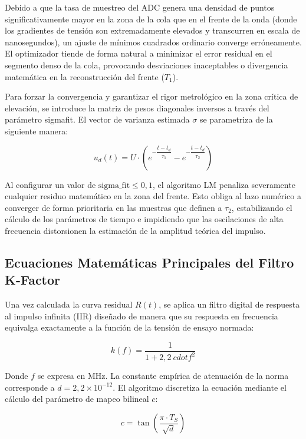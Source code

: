 Debido a que la tasa de muestreo del ADC genera una densidad de puntos significativamente mayor en la zona de la cola que en el frente de la onda (donde los gradientes de tensión son extremadamente elevados y transcurren en escala de nanosegundos), un ajuste de mínimos cuadrados ordinario converge erróneamente. El optimizador tiende de forma natural a minimizar el error residual en el segmento denso de la cola, provocando desviaciones inaceptables o divergencia matemática en la reconstrucción del frente ($T_1$).

Para forzar la convergencia y garantizar el rigor metrológico en la zona crítica de elevación, se introduce la matriz de pesos diagonales inversos a través del parámetro sigmafit. El vector de varianza estimada $\sigma$ se parametriza de la siguiente manera:

\begin{equation}
    u_d(t) = U \cdot \left( e^{-\dfrac{t-t_d}{\tau_1}} - e^{-\dfrac{t-t_d}{\tau_2}} \right)
    \label{eq:varianza estimada}
\end{equation}

Al configurar un valor de $\text{sigma\_fit} \le 0,1$, el algoritmo LM penaliza severamente cualquier residuo matemático en la zona del frente. Esto obliga al lazo numérico a converger de forma prioritaria en las muestras que definen a $\tau_2$, estabilizando el cálculo de los parámetros de tiempo e impidiendo que las oscilaciones de alta frecuencia distorsionen la estimación de la amplitud teórica del impulso.

\subsection{Ecuaciones Matemáticas Principales del Filtro K-Factor}
Una vez calculada la curva residual $R(t)$, se aplica un filtro digital de respuesta al impulso infinita (IIR) diseñado de manera que su respuesta en frecuencia equivalga exactamente a la función de la tensión de ensayo normada:

\begin{equation}
    k(f) = \frac{1}{1 + 2,2 \ cdot f^2}
\end{equation}

Donde $f$ se expresa en $\text{MHz}$. La constante empírica de atenuación de la norma corresponde a $d = 2,2 \times 10^{-12}$. El algoritmo discretiza la ecuación mediante el cálculo del parámetro de mapeo bilineal $c$:

\begin{equation}
    c = \tan\left(\frac{\pi \cdot T_S}{\sqrt{d}}\right)
\end{equation}

